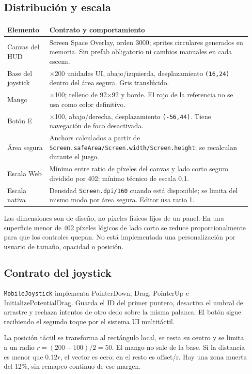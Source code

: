 \documentclass[11pt,letterpaper,oneside]{article}
\makeatletter
\newcommand{\code}[1]{\nolinkurl{#1}}
\newenvironment{spec}{\begingroup\small\begin{longtable}{@{}>{\raggedright\arraybackslash}p{0.32\textwidth}>{\raggedright\arraybackslash}p{0.64\textwidth}@{}}\toprule\textbf{Elemento} & \textbf{Contrato y comportamiento} \\ \midrule\endhead}{\bottomrule\end{longtable}\endgroup}
\makeatother
\begin{document}
\subsection{Distribución y escala}
\begin{spec}
Canvas del HUD & Screen Space Overlay, orden 3000; sprites circulares generados en memoria. Sin prefab obligatorio ni cambios manuales en cada escena. \\
Base del joystick & 200\(\times\)200 unidades UI, abajo/izquierda, desplazamiento \code{(16,24)} dentro del área segura. Gris translúcido. \\
Mango & 100\(\times\)100; relleno de 92\(\times\)92 y borde. El rojo de la referencia no se usa como color definitivo. \\
Botón E & 100\(\times\)100, abajo/derecha, desplazamiento \code{(-56,44)}. Tiene navegación de foco desactivada. \\
Área segura & Anchors calculados a partir de \code{Screen.safeArea/Screen.width/Screen.height}; se recalculan durante el juego. \\
Escala Web & Mínimo entre ratio de píxeles del canvas y lado corto seguro dividido por 402; mínimo técnico de escala 0.1. \\
Escala nativa & Densidad \code{Screen.dpi/160} cuando está disponible; se limita del mismo modo por área segura. Editor usa ratio 1. \\
\end{spec}
Las dimensiones son de diseño, no píxeles físicos fijos de un panel. En una superficie menor de 402 píxeles lógicos de lado corto se reduce proporcionalmente para que los controles quepan. No está implementada una personalización por usuario de tamaño, opacidad o posición.

\subsection{Contrato del joystick}
\code{MobileJoystick} implementa PointerDown, Drag, PointerUp e InitializePotentialDrag. Guarda el ID del primer puntero, desactiva el umbral de arrastre y rechaza intentos de otro dedo sobre la misma palanca. El botón sigue recibiendo el segundo toque por el sistema UI multitáctil.

La posición táctil se transforma al rectángulo local, se resta su centro y se limita a un radio \(r=(200-100)/2=50\). El mango no sale de la base. Si la distancia es menor que \(0.12r\), el vector es cero; en el resto es offset/r. Hay una zona muerta del 12\%, sin remapeo continuo de ese margen.
\end{document}
